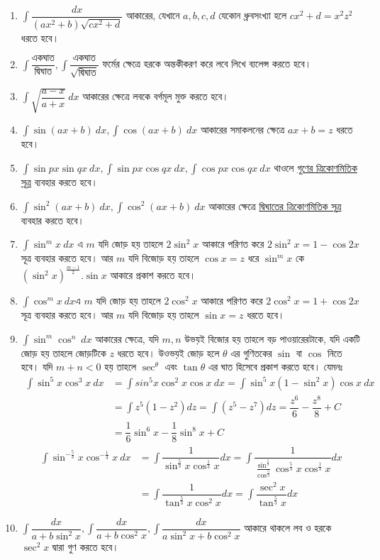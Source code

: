 \documentclass[a4paper,12pt]{article}
\newcommand{\dd}{\displaystyle}
\newcommand{\lt}{\left}
\newcommand{\rt}{\right}
\newcommand{\tm}{\item}
\begin{document}
\begin{enumerate}[ wide=0em, label=\textenglish{\textbf{ Type: \arabic*.}}, itemsep=0pt, parsep=1ex]
    \tm $\dd \int \dfrac{dx}{(ax^2+b)\sqrt{cx^2+d}} $ আকারের, যেখানে $a,b,c,d$ যেকোন ধ্রুবসংখ্যা হলে $cx^2+d=x^2z^2$ ধরতে হবে। 
    \tm $\dd \int \dfrac{\text{একঘাত}}{\text{দ্বিঘাত}}, \int \dfrac{\text{একঘাত}}{\sqrt{\text{দ্বিঘাত}}}$ ফর্মের ক্ষেত্রে হরকে অন্তকীকরণ করে লবে লিখে ব্যলেন্স করতে হবে। 
    \tm $\dd \int \sqrt{\dfrac{a-x}{a+x}} \ dx$ আকারের ক্ষেত্রে লবকে বর্গমূল মুক্ত করতে হবে। 
    \tm $\dd \int \sin (ax+b) \ dx, \int \cos (ax+b) \ dx$ আকারের সমাকলনের ক্ষেত্রে $ax+b=z$ ধরতে হবে। 
    \tm $\dd \int \sin px \sin qx \ dx, \int \sin px \cos qx \ dx,\int \cos px \cos qx \ dx $ থাওলে \hyperref[1]{গুণের ত্রিকোণমিতিক সূত্র} ব্যবহার করতে হবে।
    \tm $\dd \int \sin^2(ax+b) \ dx, \int \cos^2(ax+b) \ dx$ আকারের ক্ষেত্রে \hyperref[3]{দ্বিঘাতের ত্রিকোণমিতিক সূত্র} ব্যবহার করতে হবে। 
    \tm $\dd \int \sin^mx \ dx $ এ $m$ যদি জোড় হয় তাহলে $2\sin^2x$ আকারে পরিণত করে $2\sin^2x=1-\cos 2x$ সূত্র ব্যবহার করতে হবে। আর $m$ যদি বিজোড় হয় তাহলে $\cos x =z$ ধরে $\sin^mx$ কে $\lt( \sin^2x\rt)^{\frac{m-1}{2}}.\sin x$ আকারে প্রকাশ করতে হবে। 
    \tm $\dd \int \cos^mx \ dx$এ $m$ যদি জোড় হয় তাহলে $2\cos^2x$ আকারে পরিণত করে $2\cos^2x=1+\cos 2x$ সূত্র ব্যবহার করতে হবে। আর $m$ যদি বিজোড় হয় তাহলে $\sin x =z$ ধরতে হবে। 
    \tm $\dd \int \sin^m \cos^n \ dx$ আকারের ক্ষেত্রে, যদি $m,n$ উভয়ই বিজোর হয় তাহলে বড় পাওয়ারেরটাকে, যদি একটি জোড় হয় তাহলে জোড়টিকে $z$ ধরতে হবে। উওভয়ই জোড় হলে $\theta$ এর গুণিতকের $\sin$ বা $\cos$ নিতে হবে। যদি $m+n<0$ হয় তাহলে $\sec^\theta$ এবং $\tan \theta$ এর ঘাত  হিসেবে প্রকাশ করতে হবে। যেমনঃ
    \begin{align*}
        \int \sin^5 x \cos^3 x \ dx &= \int sin^5 x \cos ^2 x\cos x \ dx = \int \sin^5x (1-\sin^2x)\cos x \ dx\\
        &= \int z^5(1-z^2) dz = \int (z^5-z^7) dz = \dfrac{z^6}{6}-\dfrac{z^8}{8}+C\\
        &= \dfrac{1}{6} \sin^6 x-\dfrac{1}{8} \sin^8x+C
    \end{align*}
    \begin{align*}
        \int \sin^{-\frac{5}{3}}x \cos ^{-\frac{1}{3}} x \ dx &= \int \dfrac{1}{\sin^{\frac{5}{3}}x \cos ^{\frac{1}{3}} x} dx = \int \dfrac{1}{\frac{\sin ^{\frac{5}{3}}}{\cos ^{\frac{5}{3}}} \cos ^{\frac{5}{3}} x \cos ^{\frac{1}{3}} x} dx \\
        &= \int \dfrac{1}{\tan ^{\frac{5}{3}} x \cos ^2 x} dx = \int \dfrac{\sec^2 x}{\tan ^{\frac{5}{3}}x} dx
    \end{align*}
    \tm $\dd \int \dfrac{dx}{a+b\sin^2x}, \int \dfrac{dx}{a+b\cos^2x}, \int \dfrac{dx}{a\sin^2x+b\cos^2x}$ আকারে থাকলে লব ও হরকে $\sec^2x$ দ্বারা গুণ করতে হবে। 

\end{enumerate}
\end{document}
